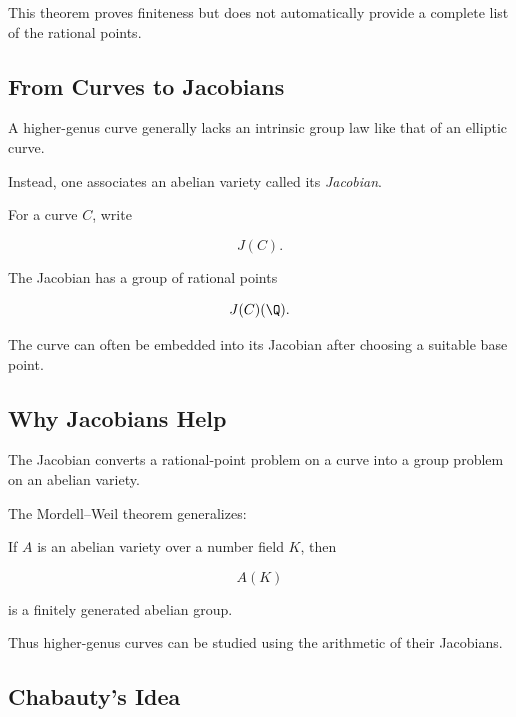 This theorem proves finiteness but does not automatically provide a complete
list of the rational points.

\subsection{From Curves to Jacobians}
\label{subsec:curves-to-jacobians-arithmetic}

A higher-genus curve generally lacks an intrinsic group law like that of an
elliptic curve.

Instead, one associates an abelian variety called its \emph{Jacobian}.

For a curve \(C\), write

\[ J(C). \]

The Jacobian has a group of rational points

\[ J(C)(\Q). \]

The curve can often be embedded into its Jacobian after choosing a suitable
base point.

\subsection{Why Jacobians Help}
\label{subsec:why-jacobians-help}

The Jacobian converts a rational-point problem on a curve into a group
problem on an abelian variety.

The Mordell--Weil theorem generalizes:

\begin{theorem}
If \(A\) is an abelian variety over a number field \(K\), then

\[ A(K) \]

is a finitely generated abelian group.
\end{theorem}

Thus higher-genus curves can be studied using the arithmetic of their
Jacobians.

\subsection{Chabauty's Idea}
\label{subsec:chabauty-arithmetic-geometry}


